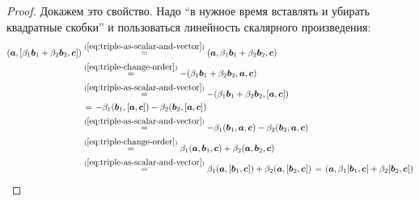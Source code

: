 \documentclass[a4paper,12pt]{article}
\begin{document}
  \begin{proof}
    Докажем это свойство.
    Надо ``в нужное время вставлять и убирать квадратные скобки'' и пользоваться линейность скалярного произведения:
    \begin{equation}
    \begin{split}
      (\boldsymbol a, [\beta_1 \boldsymbol b_1 + \beta_2 \boldsymbol b_2, \boldsymbol c])
      &\stackrel{(\ref{eq:triple-as-scalar-and-vector})}{=} (\boldsymbol a, \beta_1 \boldsymbol b_1 + \beta_2 \boldsymbol b_2, \boldsymbol c)\\
      &\stackrel{(\ref{eq:triple-change-order})}{=}         {-}(\beta_1 \boldsymbol b_1 + \beta_2 \boldsymbol b_2, \boldsymbol a, \boldsymbol c)\\
      &\stackrel{(\ref{eq:triple-as-scalar-and-vector})}{=} {-}(\beta_1 \boldsymbol b_1 + \beta_2 \boldsymbol b_2, [\boldsymbol a, \boldsymbol c])\\
      &\stackrel{\hphantom{(1)}}{=}                         {-}\beta_1(\boldsymbol b_1, [\boldsymbol a, \boldsymbol c]) - \beta_2(\boldsymbol b_2, [\boldsymbol a, \boldsymbol c])\\
      &\stackrel{(\ref{eq:triple-as-scalar-and-vector})}{=} {-}\beta_1(\boldsymbol b_1, \boldsymbol a, \boldsymbol c) - \beta_2(\boldsymbol b_2, \boldsymbol a, \boldsymbol c)\\
      &\stackrel{(\ref{eq:triple-change-order})}{=}         \beta_1(\boldsymbol a, \boldsymbol b_1, \boldsymbol c) + \beta_2(\boldsymbol a, \boldsymbol b_2, \boldsymbol c)\\
      &\stackrel{(\ref{eq:triple-as-scalar-and-vector})}{=} \beta_1(\boldsymbol a, [\boldsymbol b_1, \boldsymbol c]) + \beta_2(\boldsymbol a, [\boldsymbol b_2, \boldsymbol c])
      \stackrel{\hphantom{(1)}}{=}                         (\boldsymbol a, \beta_1[\boldsymbol b_1, \boldsymbol c] + \beta_2[\boldsymbol b_2, \boldsymbol c])
    \end{split}
    \end{equation}
  \end{proof}
  
\end{document}
